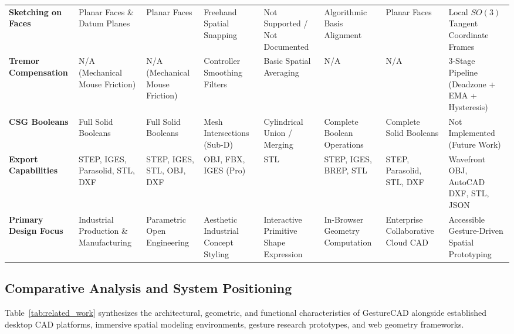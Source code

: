 \begin{table}[t]
\begin{tabular}{p{2.5cm}p{1.8cm}p{1.8cm}p{1.8cm}p{2.2cm}p{2.2cm}p{2.0cm}p{1.8cm}}
\textbf{Sketching on Faces} & Planar Faces \& Datum Planes & Planar Faces & Freehand Spatial Snapping & Not Supported / Not Documented & Algorithmic Basis Alignment & Planar Faces & Local $SO(3)$ Tangent Coordinate Frames \\
\textbf{Tremor Compensation} & N/A (Mechanical Mouse Friction) & N/A (Mechanical Mouse Friction) & Controller Smoothing Filters & Basic Spatial Averaging & N/A & N/A & 3-Stage Pipeline (Deadzone + EMA + Hysteresis) \\
\textbf{CSG Booleans} & Full Solid Booleans & Full Solid Booleans & Mesh Intersections (Sub-D) & Cylindrical Union / Merging & Complete Boolean Operations & Complete Solid Booleans & Not Implemented (Future Work) \\
\textbf{Export Capabilities} & STEP, IGES, Parasolid, STL, DXF & STEP, IGES, STL, OBJ, DXF & OBJ, FBX, IGES (Pro) & STL & STEP, IGES, BREP, STL & STEP, Parasolid, STL, DXF & Wavefront OBJ, AutoCAD DXF, STL, JSON \\
\textbf{Primary Design Focus} & Industrial Production \& Manufacturing & Parametric Open Engineering & Aesthetic Industrial Concept Styling & Interactive Primitive Shape Expression & In-Browser Geometry Computation & Enterprise Collaborative Cloud CAD & Accessible Gesture-Driven Spatial Prototyping \\
\bottomrule
\end{tabular}
\end{table}

\subsection{Comparative Analysis and System Positioning}
Table~\ref{tab:related_work} synthesizes the architectural, geometric, and functional characteristics of GestureCAD alongside established desktop CAD platforms, immersive spatial modeling environments, gesture research prototypes, and web geometry frameworks.

